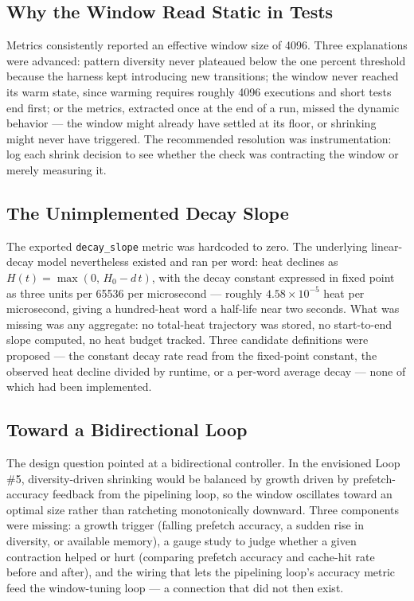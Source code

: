 \subsection{Why the Window Read Static in Tests}

Metrics consistently reported an effective window size of 4096. Three
explanations were advanced: pattern diversity never plateaued below the one
percent threshold because the harness kept introducing new transitions; the
window never reached its warm state, since warming requires roughly 4096
executions and short tests end first; or the metrics, extracted once at the end
of a run, missed the dynamic behavior --- the window might already have settled
at its floor, or shrinking might never have triggered. The recommended
resolution was instrumentation: log each shrink decision to see whether the
check was contracting the window or merely measuring it.

\subsection{The Unimplemented Decay Slope}

The exported \texttt{decay\_slope} metric was hardcoded to zero. The underlying
linear-decay model nevertheless existed and ran per word: heat declines as
$H(t) = \max(0,\, H_0 - d\,t)$, with the decay constant expressed in \Qtype{}
fixed point as three units per 65536 per microsecond --- roughly
$4.58\times10^{-5}$ heat per microsecond, giving a hundred-heat word a half-life
near two seconds. What was missing was any aggregate: no total-heat trajectory
was stored, no start-to-end slope computed, no heat budget tracked. Three
candidate definitions were proposed --- the constant decay rate read from the
fixed-point constant, the observed heat decline divided by runtime, or a per-word
average decay --- none of which had been implemented.

\subsection{Toward a Bidirectional Loop}

The design question pointed at a bidirectional controller. In the envisioned
Loop \#5, diversity-driven shrinking would be balanced by growth driven by
prefetch-accuracy feedback from the pipelining loop, so the window oscillates
toward an optimal size rather than ratcheting monotonically downward. Three
components were missing: a growth trigger (falling prefetch accuracy, a sudden
rise in diversity, or available memory), a gauge study to judge whether a given
contraction helped or hurt (comparing prefetch accuracy and cache-hit rate before
and after), and the wiring that lets the pipelining loop's accuracy metric feed
the window-tuning loop --- a connection that did not then exist.

